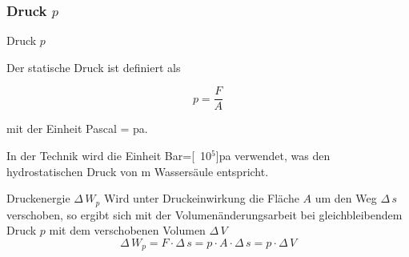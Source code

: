 \begin{frame}
  \frametitle{Druck $p$}
  \begin{block}{Druck $p$}
    \parbox[c]{0.43\linewidth}{%
    Der statische Druck ist definiert als}
    \parbox[c]{0.15\linewidth}{%
    \[ p=\frac{F}{A}\] }
    \parbox[c]{0.4\linewidth}{%
    mit der Einheit \unit[1]{Pascal} = \unit[1]{pa}.}
    
    In der Technik wird 
    die Einheit \unit[1]{Bar}=\unit[10$^\text{5}$]{pa} verwendet, was 
    den hydrostatischen Druck von \unit[10]{m} Wassers\"aule entspricht.
  \end{block}
  \begin{block}{Druckenergie $\Delta\,W_p$}
    Wird unter Druckeinwirkung die Fl\"ache $A$ um den Weg 
    $\Delta\,s$ verschoben, so ergibt sich
    mit der Volumen\"anderungsarbeit bei gleichbleibendem Druck $p$ 
    mit dem verschobenen Volumen $\Delta\,V$
    \[
      \Delta\,W_p = F \cdot \Delta\,s = p \cdot A \cdot \Delta\,s = p \cdot \Delta\,V
    \]
  \end{block}
  

  \ifteacher%
  \else%
    \vspace*{-0.50\baselineskip}\rotatebox[origin=lB]{180}{%
    \resizebox{0.9\linewidth}{!}{\parbox[t]{3.95\linewidth}{%
    \ \\
    \ .
    \ %
    }}}
  \fi%



\end{frame}
